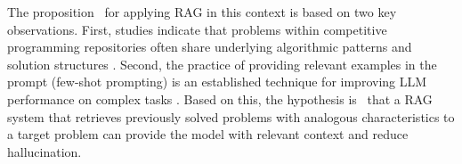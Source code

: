 \documentclass[preprint,12pt]{elsarticle}
\begin{document}

The %
proposition%
~for applying RAG in this context is based on two key observations. First, studies indicate that problems within competitive programming repositories often share underlying algorithmic patterns and solution structures \cite{deng2025cpretdatasetbenchmarkmodel, dickey2025failureplagiarismdetectioncompetitive}. Second, the practice of providing relevant examples in the prompt (few-shot prompting) is an established technique for improving LLM performance on complex tasks \cite{openai_prompt_engineering_2025, ma2023fairnessguidedfewshotpromptinglarge}. Based on this,%
the hypothesis is
~that a RAG system that retrieves previously solved problems with analogous characteristics to a target problem can provide the model with relevant context and reduce hallucination. %



\end{document}

